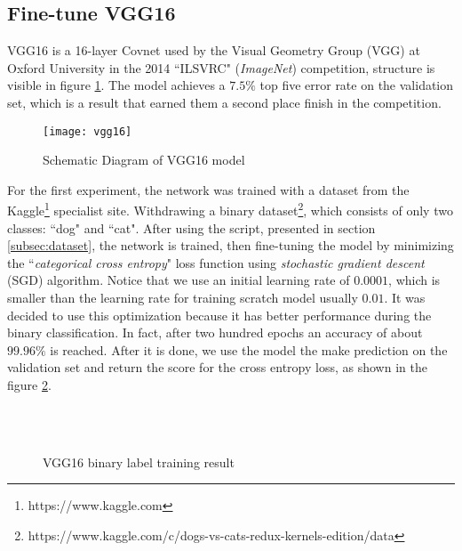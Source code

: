 \subsection{Fine-tune VGG16} 
\label{subsec:vgg16}
VGG16 is a 16-layer Covnet used by the Visual Geometry Group (VGG) at Oxford 
University in the 2014 ``ILSVRC" (\emph{ImageNet}) competition,
structure is visible in figure \ref{fig:vgg16schema}. 
The model achieves a $7.5\%$ top five error rate on the validation set, which 
is a result that earned them a second place finish in the competition.
%
\begin{figure}[htb]
\centering
\texttt{[image: vgg16]}
\caption{Schematic Diagram of VGG16 model}
\label{fig:vgg16schema}
\end{figure}
%
For the first experiment, the network was trained with a dataset from 
the Kaggle\footnote{https://www.kaggle.com} specialist site. 
Withdrawing a binary 
dataset\footnote{https://www.kaggle.com/c/dogs-vs-cats-redux-kernels-edition/data}, 
which consists of only two classes: ``dog" and ``cat".
After using the script, presented in section \ref {subsec:dataset}, the network
is trained, then fine-tuning the model by minimizing the ``\emph{categorical 
cross entropy}" loss function using \emph {stochastic gradient descent} (SGD) 
algorithm.
Notice that we use an initial learning
rate of $0.0001$, which is smaller than the learning rate for training scratch
model usually $0.01$.
It was decided to use this optimization because it has better performance 
during the binary classification.
In fact, after two hundred epochs an accuracy of about $99.96\%$ is reached. 
After it is done, we use the model the make prediction on the validation set 
and return the score for the cross entropy loss, as shown in the 
figure \ref{fig:vgg16resultbin}. \linebreak
\begin{figure}[htb]
\centering
{} \\\
\caption{VGG16 binary label training result}
\label{fig:vgg16resultbin}
\end{figure}
%

